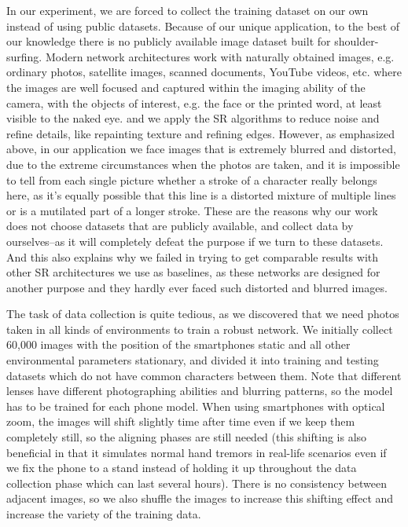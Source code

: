 In our experiment, we are forced to collect the training dataset on our own instead of using public datasets. Because of our unique application, to the best of our knowledge there is no publicly available image dataset built for shoulder-surfing. Modern network architectures work with naturally obtained images, e.g. ordinary photos, satellite images, scanned documents, YouTube videos, etc. where the images are well focused and captured within the imaging ability of the camera, with the objects of interest, e.g. the face or the printed word, at least visible to the naked eye. and we apply the SR algorithms to reduce noise and refine details, like repainting texture and refining edges. However, as emphasized above, in our application we face images that is extremely blurred and distorted, due to the extreme circumstances when the photos are taken, and it is impossible to tell from each single picture whether a stroke of a character really belongs here, as it's equally possible that this line is a distorted mixture of multiple lines or is a mutilated part of a longer stroke. These are the reasons why our work does not choose datasets that are publicly available, and collect data by ourselves--as it will completely defeat the purpose if we turn to these datasets. And this also explains why we failed in trying to get comparable results with other SR architectures we use as baselines, as these networks are designed for another purpose and they hardly ever faced such distorted and blurred images.

The task of data collection is quite tedious, as we discovered that we need photos taken in all kinds of environments to train a robust network. We initially collect 60,000 images with the position of the smartphones static and all other environmental parameters stationary, and divided it into training and testing datasets which do not have common characters between them. Note that different lenses have different photographing abilities and blurring patterns, so the model has to be trained for each phone model. When using smartphones with optical zoom, the images will shift slightly time after time even if we keep them completely still, so the aligning phases are still needed (this shifting is also beneficial in that it simulates normal hand tremors in real-life scenarios even if we fix the phone to a stand instead of holding it up throughout the data collection phase which can last several hours). There is no consistency between adjacent images, so we also shuffle the images to increase this shifting effect and increase the variety of the training data. %

